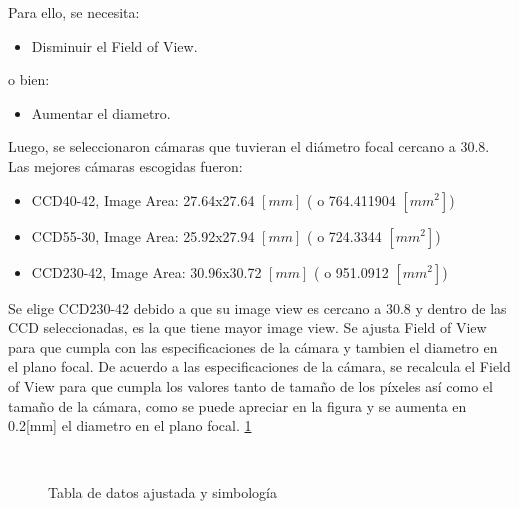 \documentclass[a4paper,10pt]{article}
\begin{document}
Para ello, se necesita:
\begin{itemize}
\item Disminuir el Field of View.
\end{itemize}
o bien:
\begin{itemize}
\item Aumentar el diametro.
\end{itemize}

Luego, se seleccionaron cámaras que tuvieran el diámetro focal cercano a 30.8.
Las mejores cámaras escogidas fueron:
\begin{itemize}
\item CCD40-42,  Image Area: 27.64x27.64 $[mm]$ ( o 764.411904 $[mm^2]$)
\item CCD55-30,  Image Area: 25.92x27.94 $[mm]$ ( o 724.3344   $[mm^2]$)
\item CCD230-42, Image Area: 30.96x30.72 $[mm]$ ( o 951.0912   $[mm^2]$)
\end{itemize}

Se elige CCD230-42 debido a que su image view es cercano a 30.8 y dentro de las CCD seleccionadas, es la que tiene mayor image view. Se ajusta Field of View para que cumpla con las
especificaciones de la cámara y tambien el diametro en el plano focal. De acuerdo a las especificaciones de la cámara,
se recalcula el Field of View para que cumpla los valores tanto de tamaño de los píxeles así
como el tamaño de la cámara, como se puede apreciar en la figura y se aumenta en 0.2[mm] el diametro en el plano focal. \ref{fig:p2}
\begin{figure}[ht!]
  \centering
  ~ 
  ~ 
  \caption{Tabla de datos ajustada y simbología}
  \label{fig:p2}
\end{figure}
\end{document}

